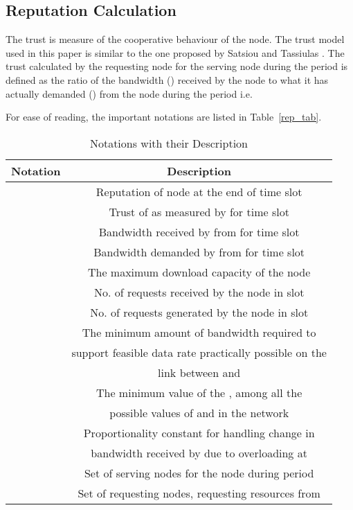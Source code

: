 \documentclass[journal]{IEEEtran}
\begin{document}
\subsection{Reputation Calculation}
The trust is measure of the cooperative behaviour of the node. The trust model used in this paper is similar to the one proposed by Satsiou and Tassiulas \cite{Satsiou}. The trust calculated by the requesting node  for the serving node   during the  period is defined as the ratio of the bandwidth () received by the node  to what it has actually demanded () from the node   during the  period i.e.
 
For ease of reading, the important notations are listed in Table~\ref{rep_tab}.
\begin{table}[]
	\caption{Notations with their Description}
	\centering
	\begin{tabular}{ |c|c|}
		\hline
		\textbf{Notation}  &\textbf{Description} \\
		
		\hline
		 &Reputation of node   at the end of   time slot\\
		\hline
		 &Trust of  as measured by   for   time slot\\
		\hline
		 &Bandwidth received by  from  for  time slot\\
		\hline
		 &Bandwidth demanded  by  from   for  time slot\\
		\hline
		 &The maximum download capacity of the node   \\
		\hline
		 &No. of requests received by the node  in  slot \\ 
		\hline
		 &No. of requests generated by the node  in  slot \\ 
		\hline
		 &The minimum amount of bandwidth required to  \\
		& support feasible data rate practically possible on the  \\   
		& link between  and \\
		\hline
		 &The minimum value of the , among all the\\ 
		&   possible values of  and  in the network \\ 
		\hline
		 &Proportionality constant for handling change in \\
		& bandwidth received by  due to overloading at \\ 
		\hline
		   & Set of serving nodes for the node  during  period\\
		\hline
		   & Set of requesting nodes, requesting resources from \\
		

\end{tabular}
\end{table}
\end{document}
